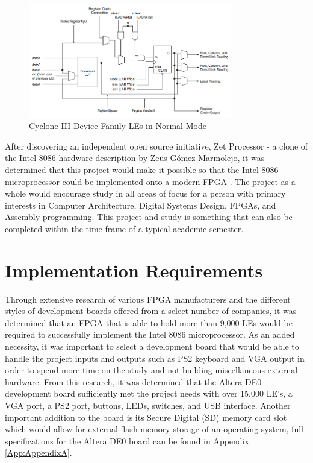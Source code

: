 \documentclass[11pt,peerreview, onecolumn]{IEEEtran}
\begin{document}
\begin{figure}[!h]
\centering
\includegraphics[width=3.5in]{LogicElement}
\caption{Cyclone III Device Family LEs in Normal Mode \cite{CycloneHandbook}}
\label{fig:LogicElement}
\end{figure}

After discovering an independent open source initiative, Zet Processor - a clone of the Intel 8086 hardware description by Zeus Gómez Marmolejo, it was determined that this project would make it possible so that the Intel 8086 microprocessor could be implemented onto a modern FPGA \cite{ZetProcessor}. The project as a whole would encourage study in all areas of focus for a person with primary interests in Computer Architecture, Digital Systems Design, FPGAs, and Assembly programming. This project and study  is something that can also be completed within the time frame of a typical academic semester.


\section{Implementation Requirements}
Through extensive research of various FPGA manufacturers and the different styles of development boards offered from a select number of companies, it was determined that an FPGA that is able to hold more than 9,000 LEs would be required to successfully implement the Intel 8086 microprocessor. As an added necessity, it was important to select a development board that would be able to handle the project inputs and outputs such as PS2 keyboard and VGA output in order to spend more time on the study and not building miscellaneous external hardware. From this research, it was determined that the Altera DE0 development board sufficiently met the project needs with over 15,000 LE's, a VGA port, a PS2 port, buttons, LEDs, switches, and USB interface. Another important addition to the board is its Secure Digital (SD) memory card slot which would allow for external flash memory storage of an operating system, full specifications for the Altera DE0 board can be found in Appendix \ref{App:AppendixA}.
\end{document}
